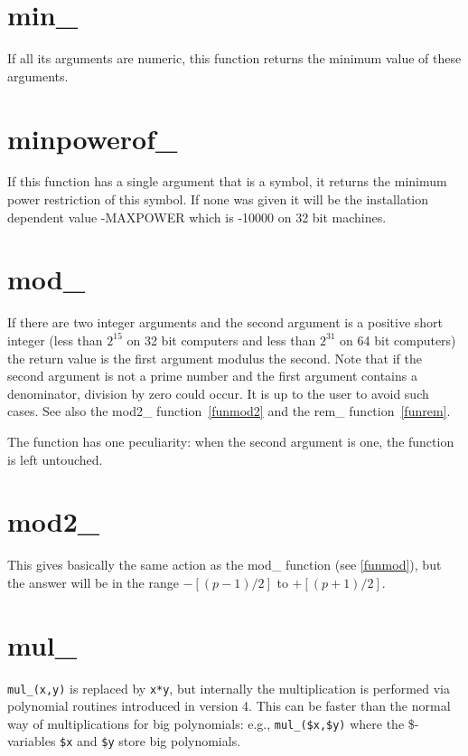 \section{min\_}
\label{funmin}
\noindent If all its arguments are numeric, this function returns 
the minimum value of these arguments.


\section{minpowerof\_}
\label{funminpowerof}
\noindent If this function has a single argument that is a symbol, it 
returns the minimum power restriction of this symbol. If none was given it 
will be the installation dependent value -MAXPOWER which is -10000 on 32 bit 
machines.


\section{mod\_}
\label{funmod}
\noindent If there are two integer arguments and the second 
argument is a positive short integer (less than $2^{15}$ on 32 bit 
computers and less than $2^{31}$ on 64 bit computers) the return value is 
the first argument modulus the second. Note that if the second argument is 
not a prime number and the first argument contains a denominator, division 
by zero could occur. It is up to the user to avoid such cases. See also the 
mod2\_ function~\ref{funmod2} and the rem\_ function~\ref{funrem}.

The function has one peculiarity: when the second argument is one, the 
function is left untouched.


\section{mod2\_}
\label{funmod2}
\noindent This gives basically the same action as the mod\_ function (see 
\ref{funmod}), but the answer will be in the range $-[(p-1)/2]$ to 
$+[(p+1)/2]$.


\section{mul\_}
\label{funmul}
\noindent \verb|mul_(x,y)| is replaced by \verb|x*y|, but internally
the multiplication is performed via polynomial routines introduced in
\FORM{} version 4. This can be faster than the normal way of multiplications
for big polynomials: e.g., \verb|mul_($x,$y)| where the \$-variables \verb|$x|
and \verb|$y| store big polynomials.

